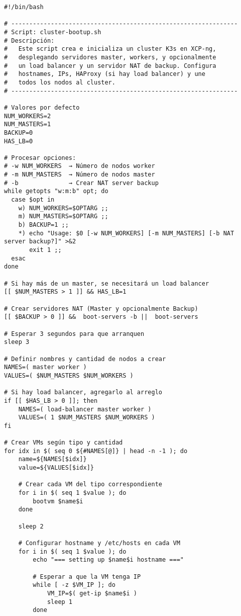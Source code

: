 \begin{verbatim}
#!/bin/bash

# ---------------------------------------------------------------
# Script: cluster-bootup.sh
# Descripción:
#   Este script crea e inicializa un cluster K3s en XCP-ng, 
#   desplegando servidores master, workers, y opcionalmente 
#   un load balancer y un servidor NAT de backup. Configura 
#   hostnames, IPs, HAProxy (si hay load balancer) y une 
#   todos los nodos al cluster.
# ---------------------------------------------------------------

# Valores por defecto
NUM_WORKERS=2
NUM_MASTERS=1
BACKUP=0
HAS_LB=0

# Procesar opciones:
# -w NUM_WORKERS  → Número de nodos worker
# -m NUM_MASTERS  → Número de nodos master
# -b              → Crear NAT server backup
while getopts "w:m:b" opt; do
  case $opt in
    w) NUM_WORKERS=$OPTARG ;;
    m) NUM_MASTERS=$OPTARG ;;
    b) BACKUP=1 ;;
    *) echo "Usage: $0 [-w NUM_WORKERS] [-m NUM_MASTERS] [-b NAT server backup?]" >&2
       exit 1 ;;
  esac
done

# Si hay más de un master, se necesitará un load balancer
[[ $NUM_MASTERS > 1 ]] && HAS_LB=1 

# Crear servidores NAT (Master y opcionalmente Backup)
[[ $BACKUP > 0 ]] &&  boot-servers -b ||  boot-servers 

# Esperar 3 segundos para que arranquen
sleep 3

# Definir nombres y cantidad de nodos a crear
NAMES=( master worker )
VALUES=( $NUM_MASTERS $NUM_WORKERS )

# Si hay load balancer, agregarlo al arreglo
if [[ $HAS_LB > 0 ]]; then
    NAMES=( load-balancer master worker )
    VALUES=( 1 $NUM_MASTERS $NUM_WORKERS )
fi

# Crear VMs según tipo y cantidad
for idx in $( seq 0 ${#NAMES[@]} | head -n -1 ); do
    name=${NAMES[$idx]}
    value=${VALUES[$idx]} 

    # Crear cada VM del tipo correspondiente
    for i in $( seq 1 $value ); do
        bootvm $name$i
    done

    sleep 2

    # Configurar hostname y /etc/hosts en cada VM
    for i in $( seq 1 $value ); do
        echo "=== setting up $name$i hostname ==="
        
        # Esperar a que la VM tenga IP
        while [ -z $VM_IP ]; do 
            VM_IP=$( get-ip $name$i )
            sleep 1
        done


\end{verbatim}
